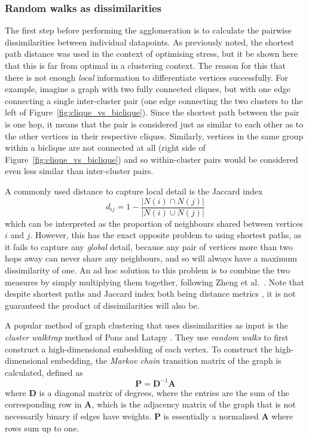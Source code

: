 \subsubsection{Random walks as dissimilarities}
The first step before performing the agglomeration is to calculate the pairwise dissimilarities between individual datapoints. As previously noted, the shortest path distance was used in the context of optimising stress, but it be shown here that this is far from optimal in a clustering context.
The reason for this that there is not enough \emph{local} information to differentiate vertices successfully.
For example, imagine a graph with two fully connected cliques, but with one edge connecting a single inter-cluster pair (one edge connecting the two clusters to the left of Figure~\ref{fig:clique_vs_biclique}). Since the shortest path between the pair is one hop, it means that the pair is considered just as similar to each other as to the other vertices in their respective cliques.
Similarly, vertices in the same group within a biclique are not connected at all (right side of Figure~\ref{fig:clique_vs_biclique}) and so within-cluster pairs would be considered even less similar than inter-cluster pairs.

A commonly used distance to capture local detail is the Jaccard index
\begin{equation}
  d_{ij} = 1 - \frac{|N(i) \cap N(j)|}{|N(i) \cup N(j)|}
  \label{eq:jaccard}
\end{equation}
which can be interpreted as the proportion of neighbours shared between vertices $i$ and $j$. However, this has the exact opposite problem to using shortest paths, as it fails to capture any \emph{global} detail, because any pair of vertices more than two hops away can never share any neighbours, and so will always have a maximum dissimilarity of one.
An ad hoc solution to this problem is to combine the two measures by simply multiplying them together, following Zheng et al.\ \cite{Zheng2018}. Note that despite shortest paths and Jaccard index both being distance metrics \cite{Clarkson2006}, it is not guaranteed the product of dissimilarities will also be.

A popular method of graph clustering that uses dissimilarities as input is the \emph{cluster walktrap} method of Pons and Latapy \cite{Pons2006}. They use \emph{random walks} to first construct a high-dimensional embedding of each vertex.
To construct the high-dimensional embedding, the \emph{Markov chain} transition matrix of the graph is calculated, defined as
\begin{equation}
  \mathbf{P} = \mathbf{D}^{-1} \mathbf{A}
\end{equation}
where $\mathbf{D}$ is a diagonal matrix of degrees, where the entries are the sum of the corresponding row in $\mathbf{A}$, which is the adjacency matrix of the graph that is not necessarily binary if edges have weights. $\mathbf{P}$ is essentially a normalised $\mathbf{A}$ where rows sum up to one.

